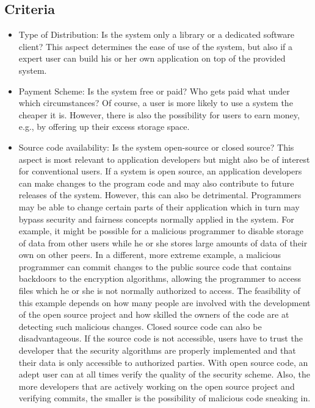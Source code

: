 \subsection{Criteria}
\begin{itemize}
\item Type of Distribution: Is the system only a library or a dedicated software client?
This aspect determines the ease of use of the system, but also if a expert user can build his or her own application on top of the provided system.

\item Payment Scheme: Is the system free or paid? Who gets paid what under which circumstances?
Of course, a user is more likely to use a system the cheaper it is. However, there is also the possibility for users to earn money, e.g., by offering up their excess storage space.

\item Source code availability: Is the system open-source or closed source?
This aspect is most relevant to application developers but might also be of interest for conventional users. If a system is open source, an application developers can make changes to the program code and may also contribute to future releases of the system. However, this can also be detrimental. Programmers may be able to change certain parts of their application which in turn may bypass security and fairness concepts normally applied in the system. For example, it might be possible for a malicious programmer to disable storage of data from other users while he or she stores large amounts of data of their own on other peers. In a different, more extreme example, a malicious programmer can commit changes to the public source code that contains backdoors to the encryption algorithms, allowing the programmer to access files which he or she is not normally authorized to access. The feasibility of this example depends on how many people are involved with the development of the open source project and how skilled the owners of the code are at detecting such malicious changes.
Closed source code can also be disadvantageous. If the source code is not accessible, users have to trust the developer that the security algorithms are properly implemented and that their data is only accessible to authorized parties. With open source code, an adept user can at all times verify the quality of the security scheme. Also, the more developers that are actively working on the open source project and verifying commits, the smaller is the possibility of malicious code sneaking in.


\end{itemize}
